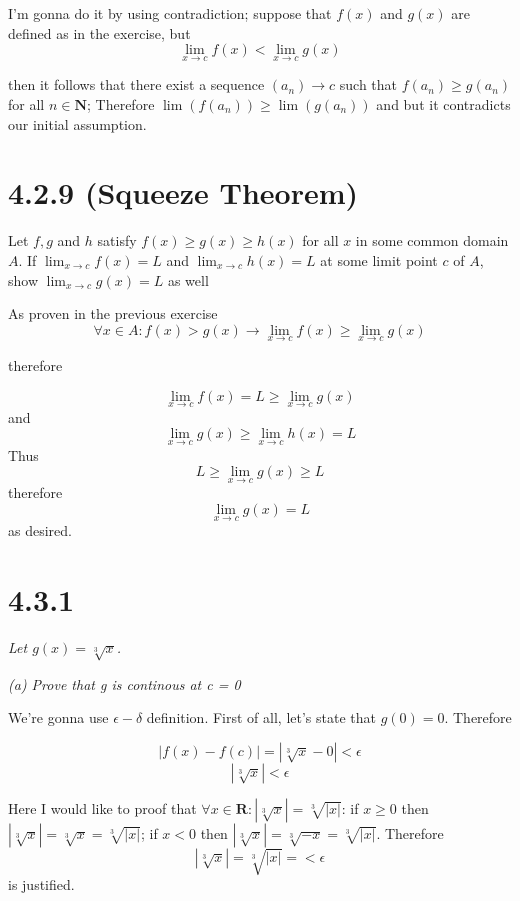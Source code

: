 \documentclass[11pt,oneside,titlepage]{article}
\begin{document}
I'm gonna do it by using contradiction; suppose that $f(x)$ and $g(x)$ are defined as in the
exercise, but
$$\lim_{x \to c} f(x) <  \lim_{x \to c} g(x) $$






then it follows that there exist a sequence $(a_n) \to c$ such that $f(a_n) \geq g(a_n)$ for all
$n \in \textbf{N}$; Therefore $\lim(f(a_n)) \geq \lim(g(a_n))$ and  but it contradicts our
initial assumption.

\section*{4.2.9 (Squeeze Theorem)} Let $f,g$ and $h$ satisfy $f(x) \geq g(x) \geq h(x)$ for all
$x$ in some common domain $A$. If $\lim_{x \to c}f(x) = L$ and $\lim_{x \to c}h(x) = L$ at some
limit point $c$ of  $A$, show $\lim_{x \to c}g(x) = L$ as well

As proven in the previous exercise
$$\forall x \in A: f(x) > g(x) \to \lim_{x \to c} f(x) \geq \lim_{x \to c} g(x) $$

therefore

$$\lim_{x \to c} f(x) = L \geq \lim_{x \to c} g(x) $$
and
$$\lim_{x \to c} g(x) \geq \lim_{x \to c} h(x) = L $$
Thus 
$$ L \geq\lim_{x \to c} g(x) \geq L  $$
therefore
$$\lim_{x \to c} g(x) = L  $$
as desired.

\section*{4.3.1}
\textit{Let $g(x) = \sqrt[3]{x}$.}

\textit{(a) Prove that g is continous at c = 0}

We're gonna use $\epsilon-\delta$ definition. First of all, let's state that $g(0) = 0$. Therefore

$$|f(x) - f(c)| = |\sqrt[3]{x} - 0|  < \epsilon $$
$$ |\sqrt[3]{x}| < \epsilon $$

Here I would like to proof that $ \forall x \in \textbf{R}: |\sqrt[3]{x}| = \sqrt[3]{|x|}$: 
if $x \geq 0$ then $|\sqrt[3]{x}| = \sqrt[3]{x}= \sqrt[3]{|x|}$;
if $x < 0$ then $|\sqrt[3]{x}| = \sqrt[3]{-x}= \sqrt[3]{|x|}$. Therefore 
$$ |\sqrt[3]{x}| = \sqrt[3]{|x|} =  < \epsilon $$ is justified.
\end{document}
